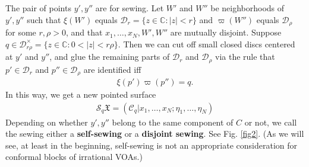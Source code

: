\documentclass[11pt,b5paper,notitlepage]{article}
\theoremstyle{definition}
\theoremstyle{plain}
\newcommand{\mc}{\mathcal}
\newcommand{\Cbb}{\mathbb C}
\newcommand{\<}{\left\langle}
\renewcommand{\>}{\right\rangle}
\newcommand{\fx}{\mathfrak{X}}
\numberwithin{equation}{subsection}
\begin{document}
The pair of points $y',y''$ are for sewing. Let $W'$ and $W''$ be neighborhoods of $y',y''$ such that $\xi(W')$ equals $\mc D_r=\{z\in\Cbb:|z|<r\}$ and $\varpi(W'')$ equals $\mc D_\rho$ for some $r,\rho>0$, and that $x_1,\dots,x_N,W',W''$ are mutually disjoint. Suppose $q\in \mc D_{r\rho}^\times=\{z\in\Cbb:0<|z|<r\rho\}$. Then we can cut off small closed discs centered at $y'$ and $y''$, and glue the remaining parts of $\mc D_r$ and $\mc D_\rho$ via the rule that $p'\in\mc D_r$ and $p''\in\mc D_\rho$ are identified iff
\begin{align}
\xi(p')\varpi(p'')=q.
\end{align}
In this way, we get a new pointed surface
\begin{align}
\mc S_q\fx=(\mc C_q|x_1,\dots,x_N;\eta_1,\dots,\eta_N)
\end{align}
Depending on whether $y',y''$ belong to the same component of $C$ or not, we call the sewing either a \textbf{self-sewing} or a \textbf{disjoint sewing}. See Fig. \ref{fig2}. (As we will see, at least in the beginning, self-sewing is not an appropriate consideration for conformal blocks of irrational VOAs.)
\end{document}
